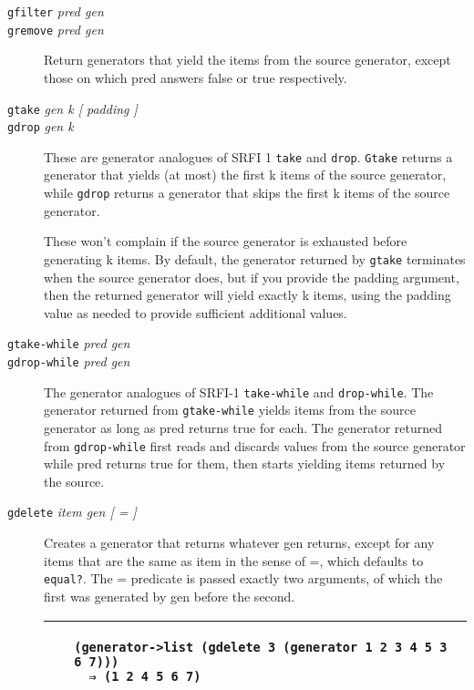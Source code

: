 \begin{description}
\item[\texttt{gfilter} \emph{pred gen}\\
\texttt{gremove} \emph{pred gen}]
Return generators that yield the items from the source generator, except
those on which pred answers false or true respectively.
\end{description}

\begin{description}
\item[\texttt{gtake} \emph{gen k {[} padding {]}}\\
\texttt{gdrop} \emph{gen k}]
These are generator analogues of SRFI 1 \texttt{take} and \texttt{drop}.
\texttt{Gtake} returns a generator that yields (at most) the first k
items of the source generator, while \texttt{gdrop} returns a generator
that skips the first k items of the source generator.

These won't complain if the source generator is exhausted before
generating k items. By default, the generator returned by \texttt{gtake}
terminates when the source generator does, but if you provide the
padding argument, then the returned generator will yield exactly k
items, using the padding value as needed to provide sufficient
additional values.
\end{description}

\begin{description}
\item[\texttt{gtake-while} \emph{pred gen}\\
\texttt{gdrop-while} \emph{pred gen}]
The generator analogues of SRFI-1 \texttt{take-while} and
\texttt{drop-while}. The generator returned from \texttt{gtake-while}
yields items from the source generator as long as pred returns true for
each. The generator returned from \texttt{gdrop-while} first reads and
discards values from the source generator while pred returns true for
them, then starts yielding items returned by the source.
\end{description}

\begin{description}
\item[\texttt{gdelete} \emph{item gen {[} = {]}}]
Creates a generator that returns whatever gen returns, except for any
items that are the same as item in the sense of =, which defaults to
\texttt{equal?}. The = predicate is passed exactly two arguments, of
which the first was generated by gen before the second.

\begin{longtable}[]{@{}ll@{}}
\toprule
\begin{minipage}[t]{0.47\columnwidth}\raggedright\strut
~\strut
\end{minipage} & \begin{minipage}[t]{0.47\columnwidth}\raggedright\strut
\begin{verbatim}
(generator->list (gdelete 3 (generator 1 2 3 4 5 3 6 7)))
  ⇒ (1 2 4 5 6 7)
\end{verbatim}
\strut
\end{minipage}\tabularnewline
\bottomrule
\end{longtable}
\end{description}

